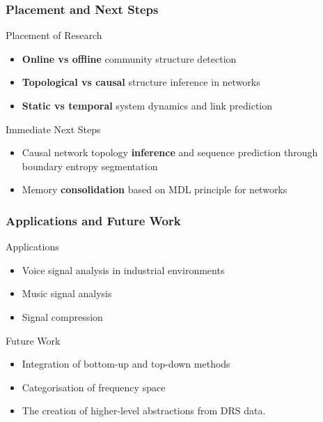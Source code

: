 \begin{frame}
  \frametitle{Placement and Next Steps}
  \begin{block}{Placement of Research}
    \begin{itemize}
      \item \textbf{Online vs offline} community structure detection 
      \item \textbf{Topological vs causal} structure inference in networks
      \item \textbf{Static vs temporal} system dynamics and link prediction 
    \end{itemize}
  \end{block}
  \begin{block}{Immediate Next Steps}
    \begin{itemize}
      \item Causal network topology \textbf{inference} and sequence prediction through boundary entropy segmentation
      \item Memory \textbf{consolidation} based on MDL principle for networks
    \end{itemize}
  \end{block}
\end{frame}

\begin{frame}
  \frametitle{Applications and Future Work}
  \begin{block}{Applications}
    \begin{itemize}
      \item Voice signal analysis in industrial environments
      \item Music signal analysis 
      \item Signal compression
    \end{itemize}
  \end{block}
  \begin{block}{Future Work}
    \begin{itemize}
      \item Integration of bottom-up and top-down methods    
      \item Categorisation of frequency space
      \item The creation of higher-level abstractions from DRS data. 
    \end{itemize}
  \end{block}
\end{frame}
